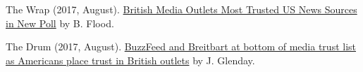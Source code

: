 \begin{bibenum}
    \item[] The Wrap (2017, August).
      \href{https://www.thewrap.com/british-media-outlets-most-trusted-us-news-sources-in-new-poll/}{British Media Outlets Most Trusted US News Sources in New Poll} by B. Flood.
    \item[] The Drum (2017, August).
      \href{http://www.thedrum.com/news/2017/08/08/buzzfeed-and-breitbart-bottom-media-trust-list-americans-place-trust-british-outlets}{BuzzFeed and Breitbart at bottom of media trust list as Americans place trust in British outlets} by J. Glenday.
  \end{bibenum}
